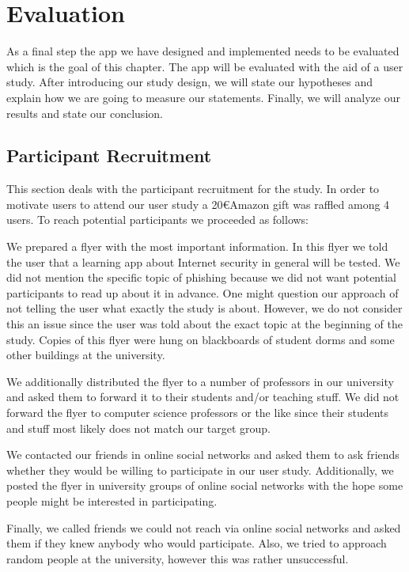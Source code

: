 \section{Evaluation}
\label{s:evaluation}
 As a final step the app we have designed and implemented needs to be evaluated which is the goal of this chapter.
 The app will be evaluated with the aid of a user study.
 After introducing our study design, we will state our hypotheses and explain how we are going to measure our statements.
 Finally, we will analyze our results and state our conclusion.


\subsection{Participant Recruitment}
\label{s:participant_recruitment}
This section deals with the participant recruitment for the study.
In order to motivate users to attend our user study a 20\euro Amazon gift was raffled among 4 users.
To reach potential participants we proceeded as follows:

\begin{description}[leftmargin=0cm]
\item[Flyer]  We prepared a flyer with the most important information. 
In this flyer we told the user that a learning app about Internet security in general will be tested. 
We did not mention the specific topic of phishing because we did not want potential participants to read up about it in advance.
One might question our approach of not telling the user what exactly the study is about.
However, we do not consider this an issue since the user was told about the exact topic at the beginning of the study.
Copies of this flyer were hung on blackboards of student dorms and some other buildings at the university.
\item[E-Mail to Professors] We additionally distributed the flyer to a number of professors in our university and asked them to forward it to their students and/or teaching stuff.
We did not forward the flyer to computer science professors or the like since their students and stuff most likely does not match our target group.
\item[Online Social Networks] We contacted our friends in online social networks and asked them to ask friends whether they would be willing to participate in our user study.
Additionally, we posted the flyer in university groups of online social networks with the hope some people might be interested in participating.
\item[Further Networks] Finally, we called friends we could not reach via online social networks and asked them if they knew anybody who would participate.
Also, we tried to approach random people at the university, however this was rather unsuccessful. 
\end{description}

